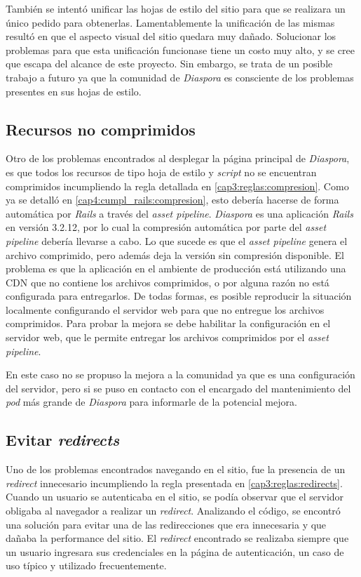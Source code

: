También se intentó unificar las hojas de estilo del sitio para que se realizara un único pedido para obtenerlas. Lamentablemente la unificación de las mismas resultó en que el
aspecto visual del sitio quedara muy dañado. Solucionar los problemas para que esta unificación funcionase tiene un costo muy alto, y se cree que escapa del alcance de este
proyecto. Sin embargo, se trata de un posible trabajo a futuro ya que la comunidad de \emph{Diaspora} es consciente de los problemas presentes en sus hojas de estilo.

\subsection{Recursos no comprimidos} 

Otro de los problemas encontrados al desplegar la página principal de \emph{Diaspora}, es que todos los recursos de tipo hoja de estilo y \emph{script} no se encuentran 
comprimidos incumpliendo la regla detallada en \ref{cap3:reglas:compresion}.
Como ya se detalló en \ref{cap4:cumpl_rails:compresion}, esto debería hacerse de forma automática por \emph{Rails} a través del \emph{asset pipeline}. \emph{Diaspora} es una 
aplicación \emph{Rails} en versión 3.2.12, por lo cual la compresión automática por parte del \emph{asset pipeline} debería llevarse a cabo. Lo que sucede es que el \emph{asset 
pipeline} genera el archivo comprimido, pero además deja la versión sin compresión disponible. El problema es que la aplicación en el ambiente de producción está utilizando una 
CDN que no contiene los archivos comprimidos, o por alguna razón no está configurada para entregarlos. De todas formas, es posible reproducir la situación localmente 
configurando el servidor web para que no entregue los archivos comprimidos. Para probar la mejora se debe habilitar la configuración en el servidor web, que le permite entregar los 
archivos comprimidos por el \emph{asset pipeline}.

En este caso no se propuso la mejora a la comunidad ya que es una configuración del servidor, pero si se puso en contacto con el encargado del mantenimiento del \emph{pod}
más grande de \emph{Diaspora} para informarle de la potencial mejora.

\subsection{Evitar \emph{redirects}}

Uno de los problemas encontrados navegando en el sitio, fue la presencia de un \emph{redirect} innecesario incumpliendo la regla presentada en \ref{cap3:reglas:redirects}.
Cuando un usuario se autenticaba en el sitio, se podía observar que el servidor obligaba al navegador a realizar un \emph{redirect}. Analizando el código, se encontró una solución 
para evitar una de las redirecciones que era innecesaria y que dañaba la performance del sitio. El \emph{redirect} encontrado se realizaba siempre que un usuario ingresara sus 
credenciales en la página de autenticación, un caso de uso típico y utilizado frecuentemente.

